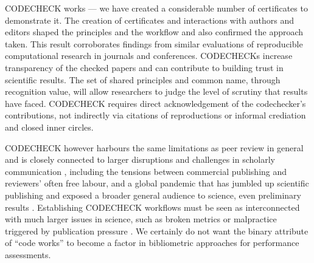 \documentclass[12pt]{article}
\begin{document}
CODECHECK works --- we have created a considerable number of
certificates to demonstrate it.  The creation of certificates and
interactions with authors and editors shaped the principles and the
workflow and also confirmed the approach taken. This result
corroborates findings from similar evaluations of reproducible
computational research in journals and conferences.  CODECHECKs
increase transparency of the checked papers and can contribute to
building trust in scientific results.
The set of shared principles and common name, through recognition
value, will allow researchers to judge the level of scrutiny that
results have faced. CODECHECK requires direct acknowledgement of the
codechecker's contributions, not indirectly via citations of
reproductions or informal crediation and closed inner circles.

CODECHECK however harbours the same limitations as peer review in
general and is closely connected to larger disruptions and challenges
in scholarly communication
\cite{eglen_recent_2018,tennant_ten_2019,fyfe_mission_2019}, including
the tensions between commercial publishing and reviewers' often free
labour, and a global pandemic that has jumbled up scientific
publishing and exposed a broader general audience to science, even
preliminary results \cite{munafo_what_2020}.  Establishing CODECHECK
workflows must be seen as interconnected with much larger issues in
science, such as broken metrics or malpractice triggered by
publication pressure
\cite{piwowar_altmetrics:_2013,nosek_promoting_2015}.  We certainly do
not want the binary attribute of ``code works'' to become a factor in
bibliometric approaches for performance assessments.
\end{document}
